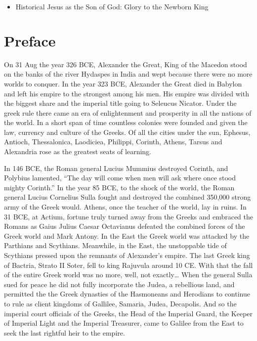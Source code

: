 \begin{itemize}
\tightlist
\item
  Historical Jesus as the Son of God: Glory to the Newborn King
\end{itemize}

\section{Preface}\label{par:preface}

On 31 Aug the year 326 BCE, Alexander the Great, King of the Macedon stood on the banks of the river Hydaspes in India and wept because there were no more worlds to conquer.
In the year 323 BCE, Alexander the Great died in Babylon and left his empire to the strongest among his men.
His empire was divided with the biggest share and the imperial title going to Seleucus Nicator.
Under the greek rule there came an era of enlightenment and prosperity in all the nations of the world.
In a short span of time countless colonies were founded and given the law, currency and culture of the Greeks.
Of all the cities under the sun, Ephesus, Antioch, Thessalonica, Laodiciea, Philippi, Corinth, Athens, Tarsus and Alexandria rose as the greatest seats of learning.

In 146 BCE, the Roman general Lucius Mummius destroyed Corinth, and Polybius lamented, ``The day will come when men will ask where once stood mighty Corinth.'' In the year 85 BCE, to the shock of the world, the Roman general Lucius Cornelius Sulla fought and destroyed the combined 350,000 strong army of the Greek would.
Athens, once the teacher of the world, lay in ruins.
In 31 BCE, at Actium, fortune truly turned away from the Greeks and embraced the Romans as Gaius Julius Caesar Octavianus defeated the combined forces of the Greek world and Mark Antony.
In the East the Greek world was attacked by the Parthians and Scythians.
Meanwhile, in the East, the unstoppable tide of Scythians pressed upon the remnants of Alexander's empire.
The last Greek king of Bactria, Strato II Soter, fell to king Rajuvula around 10 CE.
With that the fall of the entire Greek world was no more, well, not exactly\ldots{} When the general Sulla sued for peace he did not fully incorporate the Judea, a rebellious land, and permitted the the Greek dynasties of the Hasmoneans and Herodians to continue to rule as client kingdoms of Gallilee, Samaria, Judea, Decapolis.
And so the imperial court officials of the Greeks, the Head of the Imperial Guard, the Keeper of Imperial Light and the Imperial Treasurer, came to Galilee from the East to seek the last rightful heir to the empire.

